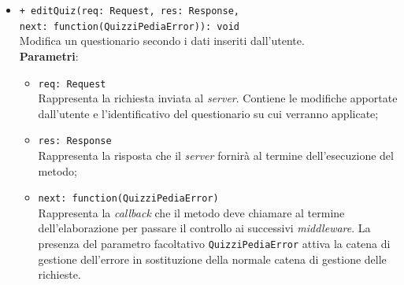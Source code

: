 \begin{itemize}
\begin{itemize}
	\item \texttt{+ editQuiz(req: Request, res: Response, \\next: function(QuizziPediaError)): void}\\
		Modifica un questionario secondo i dati inseriti dall'utente.\\
		\textbf{Parametri}:
		\begin{itemize}
			\item \texttt{req: Request}\\
			Rappresenta la richiesta inviata al \textit{server}. Contiene le modifiche apportate dall'utente e l'identificativo del questionario su cui verranno applicate;
			\item \texttt{res: Response}\\
			Rappresenta la risposta che il \textit{server} fornirà al termine dell'esecuzione del metodo;
			\item \texttt{next: function(QuizziPediaError)}\\
			Rappresenta la \textit{callback} che il metodo deve chiamare al termine dell'elaborazione per passare il controllo ai successivi \textit{middleware}. La presenza del parametro facoltativo \texttt{QuizziPediaError} attiva la catena di gestione dell'errore in sostituzione della normale catena di gestione delle richieste.
		\end{itemize}
		

\end{itemize}
\end{itemize}
